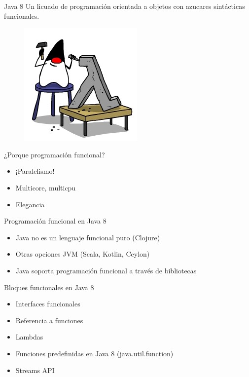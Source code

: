 \documentclass{beamer}
\begin{document}
\begin{frame}{Java 8}
Un licuado de programación orientada a objetos con azucares sintácticas funcionales.
			\begin{figure}
			\centering
			\includegraphics[width=0.5\linewidth]{Images/JavaLam-1}
			\end{figure}
\end{frame}

\begin{frame}{¿Porque programación funcional?}
	\begin{itemize}
	\item ¡Paralelismo!
	\item Multicore, multicpu
	\item Elegancia
	\end{itemize}
\end{frame}

\begin{frame}{Programación funcional en Java 8}
	\begin{itemize}
	\item Java no es un lenguaje funcional puro (Clojure)
	\item Otras opciones JVM (Scala, Kotlin, Ceylon)
	\item Java soporta programación funcional a través de bibliotecas
	\end{itemize}
\end{frame}

\begin{frame}{Bloques funcionales en Java 8}
	\begin{itemize}
	\item Interfaces funcionales
	\item Referencia a funciones
	\item Lambdas
	\item Funciones predefinidas en Java 8 (java.util.function)
	\item Streams API
	\end{itemize}
\end{frame}
\end{document}

